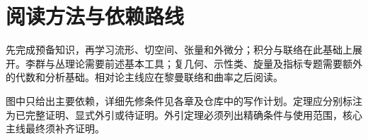 \chapter*{阅读方法与依赖路线}
先完成预备知识，再学习流形、切空间、张量和外微分；积分与联络在此基础上展开。李群与丛理论需要前述基本工具；复几何、示性类、旋量及指标专题需要额外的代数和分析基础。相对论主线应在黎曼联络和曲率之后阅读。
\begin{center}

\end{center}
图中只给出主要依赖，详细先修条件见各章及仓库中的写作计划。定理应分别标注为已完整证明、显式外引或待证明。外引定理必须列出精确条件与使用范围，核心主线最终须补齐证明。
